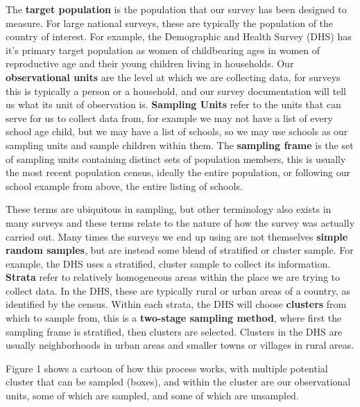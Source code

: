 \documentclass[
]{article}
\begin{document}
The \textbf{target population} is the population that our survey has been designed to measure. For large national surveys, these are typically the population of the country of interest. For example, the Demographic and Health Survey (DHS) has it's primary target population as women of childbearing ages in women of reproductive age and their young children living in households. Our \textbf{observational units} are the level at which we are collecting data, for surveys this is typically a person or a household, and our survey documentation will tell us what its unit of observation is. \textbf{Sampling Units} refer to the units that can serve for us to collect data from, for example we may not have a list of every school age child, but we may have a list of schools, so we may use schools as our sampling units and sample children within them. The \textbf{sampling frame} is the set of sampling units containing distinct sets of population members, this is usually the most recent population census, ideally the entire population, or following our school example from above, the entire listing of schools.

These terms are ubiquitous in sampling, but other terminology also exists in many surveys and these terms relate to the nature of how the survey was actually carried out. Many times the surveys we end up using are not themselves \textbf{simple random samples}, but are instead some blend of stratified or cluster sample. For example, the DHS uses a stratified, cluster sample to collect its information. \textbf{Strata} refer to relatively homogeneous areas within the place we are trying to collect data. In the DHS, these are typically rural or urban areas of a country, as identified by the census. Within each strata, the DHS will choose \textbf{clusters} from which to sample from, this is a \textbf{two-stage sampling method}, where first the sampling frame is stratified, then clusters are selected. Clusters in the DHS are usually neighborhoods in urban areas and smaller towns or villages in rural areas.

Figure 1 shows a cartoon of how this process works, with multiple potential cluster that can be sampled (boxes), and within the cluster are our observational units, some of which are sampled, and some of which are unsampled.
\end{document}

